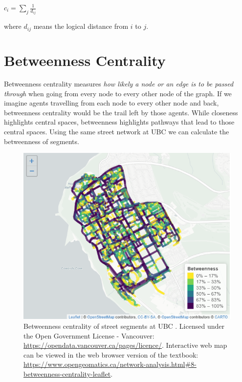 \documentclass[
]{book}
\begin{document}
\(c_i = \sum\limits_{j} \frac{1}{d_{ij}}\)

where \(d_{ij}\) means the logical distance from \(i\) to \(j\).

\section{Betweenness Centrality}\label{betweenness-centrality}

Betweenness centrality measures \emph{how likely a node or an edge is to be passed through} when going from every node to every other node of the graph. If we imagine agents travelling from each node to every other node and back, betweenness centrality would be the trail left by those agents. While closeness highlights central spaces, betweenness highlights pathways that lead to those central spaces. Using the same street network at UBC we can calculate the betweenness of segments.



\begin{figure}
\includegraphics[width=8.57in]{images/08-Betweenness-centrality-of-street-segments-at-UBC-static} \caption{Betweenness centrality of street segments at UBC \citep{city_of_vancouver_open_nodate}. Licensed under the Open Government License - Vancouver: \url{https://opendata.vancouver.ca/pages/licence/}. Interactive web map can be viewed in the web browser version of the textbook: \url{https://www.opengeomatics.ca/network-analysis.html\#8-betweenness-centrality-leaflet}.}\label{fig:8-betweenness-centrality-leaflet}
\end{figure}
\end{document}
